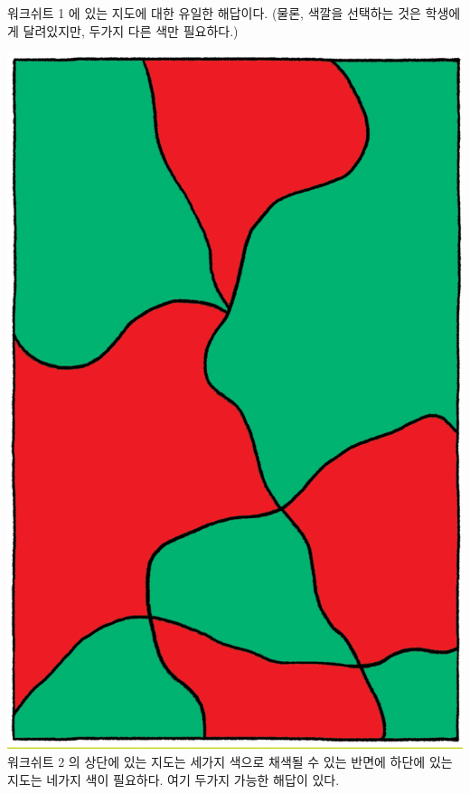 \documentclass[]{article}
\begin{document}
워크쉬트 1 에 있는 지도에 대한 유일한 해답이다. (물론, 색깔을 선택하는
것은 학생에게 달려있지만, 두가지 다른 색만 필요하다.)

\includegraphics{csunplugged/04-part/img/ch14-coloring/13-coloring-08-solution.png}
워크쉬트 2 의 상단에 있는 지도는 세가지 색으로 채색될 수 있는 반면에
하단에 있는 지도는 네가지 색이 필요하다. 여기 두가지 가능한 해답이 있다.
\end{document}
